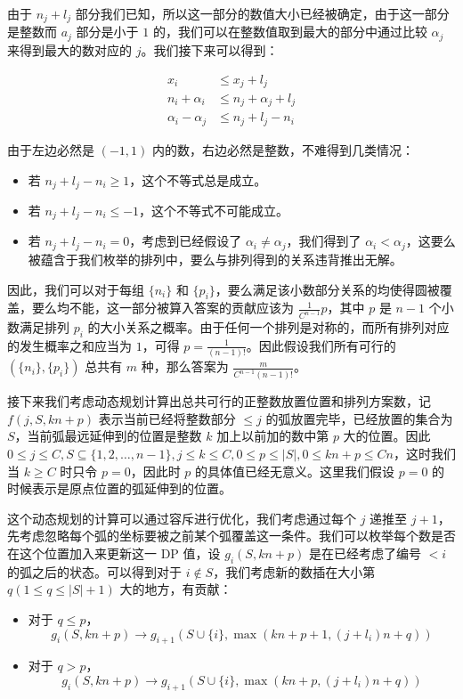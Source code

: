\documentclass[12pt]{ctexart}
\begin{document}
由于 $n_j + l_j$ 部分我们已知，所以这一部分的数值大小已经被确定，由于这一部分是整数而 $a_j$ 部分是小于 $1$ 的，我们可以在整数值取到最大的部分中通过比较 $\alpha_j$ 来得到最大的数对应的 $j$。我们接下来可以得到：

\begin{align*}
x_i & \le x_j + l_j\\
n_i + \alpha_i & \le n_j + \alpha_j + l_j\\
\alpha_i - \alpha_j & \le n_j + l_j - n_i
\end{align*}

由于左边必然是 $(-1, 1)$ 内的数，右边必然是整数，不难得到几类情况：

\begin{itemize}
\item 若 $n_j + l_j - n_i \ge 1$，这个不等式总是成立。
\item 若 $n_j + l_j - n_i \le -1$，这个不等式不可能成立。
\item 若 $n_j + l_j - n_i = 0$，考虑到已经假设了 $\alpha_i \neq \alpha_j$，我们得到了 $\alpha_i < \alpha_j$，这要么被蕴含于我们枚举的排列中，要么与排列得到的关系违背推出无解。
\end{itemize}

因此，我们可以对于每组 $\{n_i\}$ 和 $\{p_i\}$，要么满足该小数部分关系的均使得圆被覆盖，要么均不能，这一部分被算入答案的贡献应该为 $\frac1{C^{n - 1}} p$，其中 $p$ 是 $n - 1$ 个小数满足排列 $p_i$ 的大小关系之概率。由于任何一个排列是对称的，而所有排列对应的发生概率之和应当为 $1$，可得 $p = \frac1{(n-1)!}$。因此假设我们所有可行的 $(\{n_i\}, \{p_i\})$ 总共有 $m$ 种，那么答案为 $\frac{m}{C^{n-1}(n-1)!}$。

接下来我们考虑动态规划计算出总共可行的正整数放置位置和排列方案数，记 $f(j, S, kn + p)$ 表示当前已经将整数部分 $\le j$ 的弧放置完毕，已经放置的集合为 $S$，当前弧最远延伸到的位置是整数 $k$ 加上以前加的数中第 $p$ 大的位置。因此 $0\le j\le C, S\subseteq \{1, 2, \dots, n - 1\}, j\le k\le C, 0\le p\le |S|, 0\le kn + p \le Cn$，这时我们当 $k \ge C$ 时只令 $p = 0$，因此时 $p$ 的具体值已经无意义。这里我们假设 $p = 0$ 的时候表示是原点位置的弧延伸到的位置。

这个动态规划的计算可以通过容斥进行优化，我们考虑通过每个 $j$ 递推至 $j + 1$，先考虑忽略每个弧的坐标要被之前某个弧覆盖这一条件。我们可以枚举每个数是否在这个位置加入来更新这一 DP 值，设 $g_i(S, kn + p)$ 是在已经考虑了编号 $< i$ 的弧之后的状态。可以得到对于 $i \notin S$，我们考虑新的数插在大小第 $q (1\le q\le |S| + 1)$ 大的地方，有贡献：

\begin{itemize}

\item 对于 $q\le p$，
$$
g_i(S, kn + p) \rightarrow g_{i + 1}(S \cup \{i\}, \max(kn + p + 1, (j + l_i)n + q))
$$

\item 对于 $q > p$，
$$
g_i(S, kn + p) \rightarrow g_{i + 1}(S \cup \{i\}, \max(kn + p, (j + l_i)n + q))
$$

\end{itemize}
\end{document}
